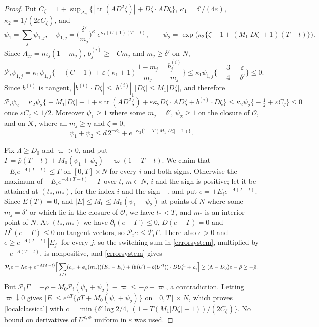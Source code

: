 \documentclass[11pt]{article}
\newcommand{\eps}{\varepsilon}
\begin{document}
\begin{proof}
Put $C_\zeta=1+\sup_{\Delta_d}\{|\operatorname{tr}(AD^2\zeta)|+D\zeta\cdot AD\zeta\}$, $\kappa_1=\delta'/(4\eps)$, $\kappa_2=1/(2\eps C_\zeta)$, and
\[
 \psi_1=\sum_j\psi_{1,j},\quad \psi_{1,j}=\Big(\frac{\delta'}{m_j}\Big)^{\kappa_1}e^{\kappa_1(C+1)(T-t)},\qquad
 \psi_2=\exp\big(\kappa_2\{\zeta-1+(M_1|D\zeta|+1)(T-t)\}\big).
\]
Since $A_{jj}=m_j(1-m_j)$, $b^{(i)}_j\ge-Cm_j$ and $m_j\ge\delta'$ on $N$,
\[
 \mathcal P_i\psi_{1,j}=\kappa_1\psi_{1,j}\Big\{-(C+1)+\eps(\kappa_1+1)\frac{1-m_j}{m_j}-\frac{b^{(i)}_j}{m_j}\Big\}
 \le\kappa_1\psi_{1,j}\Big\{-\frac34+\frac\eps{\delta'}\Big\}\le0.
\]
Since $b^{(i)}$ is tangent, $|b^{(i)}\cdot D\zeta|\le|b^{(i)}|_1|D\zeta|\le M_1|D\zeta|$, and therefore
\[
 \mathcal P_i\psi_2=\kappa_2\psi_2\big\{-M_1|D\zeta|-1+\eps\operatorname{tr}(AD^2\zeta)+\eps\kappa_2D\zeta\cdot AD\zeta+b^{(i)}\cdot D\zeta\big\}
 \le\kappa_2\psi_2\big\{-\tfrac12+\eps C_\zeta\big\}\le0
\]
once $\eps C_\zeta\le1/2$. Moreover $\psi_1\ge1$ where some $m_j=\delta'$, $\psi_2\ge1$ on the closure of $\mathcal O$, and on $\mathcal K$, where all $m_j\ge\eta$ and $\zeta=0$,
\[
 \psi_1+\psi_2\le d\,2^{-\kappa_1}+e^{-\kappa_2\{1-T(M_1|D\zeta|+1)\}}.
\]

Fix $\Lambda\ge D_0$ and $\varpi>0$, and put $\Gamma=\bar\rho(T-t)+M_0(\psi_1+\psi_2)+\varpi(1+T-t)$. We claim that $\pm E_ie^{-\Lambda(T-t)}\le\Gamma$ on $[0,T]\times N$ for every $i$ and both signs. Otherwise the maximum of $\pm E_ie^{-\Lambda(T-t)}-\Gamma$ over $t$, $m\in N$, $i$ and the sign is positive; let it be attained at $(t_*,m_*)$, for the index $i$ and the sign $\pm$, and put $e=\pm E_ie^{-\Lambda(T-t)}$. Since $E(T)=0$, and $|E|\le M_0\le M_0(\psi_1+\psi_2)$ at points of $N$ where some $m_j=\delta'$ or which lie in the closure of $\mathcal O$, we have $t_*<T$, and $m_*$ is an interior point of $N$. At $(t_*,m_*)$ we have $\partial_t(e-\Gamma)\le0$, $D(e-\Gamma)=0$ and $D^2(e-\Gamma)\le0$ on tangent vectors, so $\mathcal P_ie\le\mathcal P_i\Gamma$. There also $e>0$ and $e\ge e^{-\Lambda(T-t)}|E_j|$ for every $j$, so the switching sum in \eqref{errorsystem}, multiplied by $\pm e^{-\Lambda(T-t)}$, is nonpositive, and \eqref{errorsystem} gives
\[
 \mathcal P_ie=\Lambda e\mp e^{-\Lambda(T-t)}\Big[\sum_{j\ne i}(c_{ij}+\phi_\eps(m_j))(E_j-E_i)+(b(U)-b(U^{\rm cl}))\cdot DU^{\rm cl}_i+\rho_i\Big]\ge(\Lambda-D_0)e-\bar\rho\ge-\bar\rho.
\]
But $\mathcal P_i\Gamma=-\bar\rho+M_0\mathcal P_i(\psi_1+\psi_2)-\varpi\le-\bar\rho-\varpi$, a contradiction. Letting $\varpi\downarrow0$ gives $|E|\le e^{\Lambda T}\{\bar\rho T+M_0(\psi_1+\psi_2)\}$ on $[0,T]\times N$, which proves \eqref{localclassical} with $c=\min\{\delta'\log2/4,\ (1-T(M_1|D\zeta|+1))/(2C_\zeta)\}$. No bound on derivatives of $U^{\eps,\phi}$ uniform in $\eps$ was used.
\end{proof}
\end{document}
